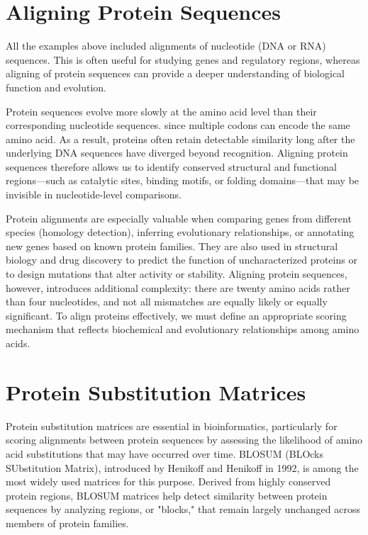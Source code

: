 \section{Aligning Protein Sequences}

All the examples above included alignments of nucleotide (DNA or RNA) sequences. This is often useful for studying genes and regulatory regions, whereas aligning of protein sequences can provide a deeper understanding of biological function and evolution. 

Protein sequences evolve more slowly at the amino acid level than their corresponding nucleotide sequences. 
since multiple codons can encode the same amino acid. As a result, proteins often retain detectable similarity 
long after the underlying DNA sequences have diverged beyond recognition. Aligning protein sequences therefore 
allows us to identify conserved structural and functional regions—such as catalytic sites, binding motifs, or 
folding domains—that may be invisible in nucleotide-level comparisons.

Protein alignments are especially valuable when comparing genes from different species (homology detection), 
inferring evolutionary relationships, or annotating new genes based on known protein families. They are also 
used in structural biology and drug discovery to predict the function of uncharacterized proteins or to 
design mutations that alter activity or stability. Aligning protein sequences, however, introduces additional complexity: there are twenty amino acids rather than four nucleotides, and not all mismatches are equally likely or equally significant. To align proteins effectively, we must define an appropriate scoring mechanism that reflects biochemical and evolutionary relationships among amino acids.

\section{Protein Substitution Matrices}

Protein substitution matrices are essential in bioinformatics, particularly for scoring alignments between protein sequences by assessing the likelihood of amino acid substitutions that may have occurred over time. BLOSUM (BLOcks SUbstitution Matrix), introduced by Henikoff and Henikoff in 1992, is among the most widely used matrices for this purpose. Derived from highly conserved protein regions, BLOSUM matrices help detect similarity between protein sequences by analyzing regions, or "blocks," that remain largely unchanged across members of protein families.

